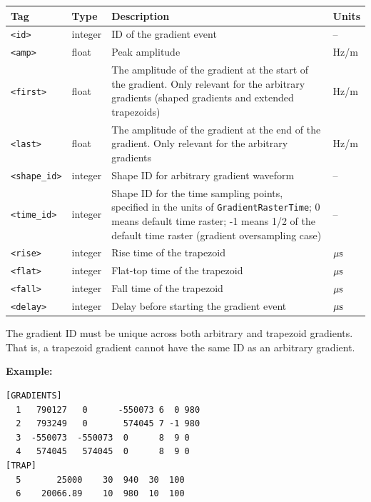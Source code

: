 \documentclass{article}
\begin{document}
\begin{tabularx}{\textwidth}{llXl}
\toprule
Tag & Type & Description & Units\\
\midrule
\verb.<id>. & integer & ID of the gradient event & -- \\
\verb.<amp>. & float & Peak amplitude & Hz/m \\
\verb.<first>. & float & The amplitude of the gradient at the start of the gradient. Only relevant for the arbitrary gradients (shaped gradients and extended trapezoids) & Hz/m \\
\verb.<last>. & float & The amplitude of the gradient at the end of the gradient. Only relevant for the arbitrary gradients & Hz/m \\
\verb.<shape_id>. & integer & Shape ID for arbitrary gradient waveform & -- \\
\verb.<time_id>. & integer & Shape ID for the time sampling points, specified in the units of \verb.GradientRasterTime.; 0 means default time raster; -1 means 1/2 of the default time raster (gradient oversampling case) & -- \\
\verb.<rise>. & integer & Rise time of the trapezoid & $\rm \mu s$ \\
\verb.<flat>. & integer & Flat-top time of the trapezoid & $\rm \mu s$ \\
\verb.<fall>. & integer & Fall time of the trapezoid & $\rm \mu s$ \\
\verb.<delay>. & integer & Delay before starting the gradient event & $\rm \mu s$\\
\bottomrule
\end{tabularx}

The gradient ID must be unique across both arbitrary and trapezoid gradients. That is, a trapezoid gradient cannot have the same ID as an arbitrary gradient.


\begin{minipage}{\textwidth}
\textbf{Example:}
\begin{lstlisting}
[GRADIENTS]
  1   790127   0      -550073 6  0 980
  2   793249   0       574045 7 -1 980
  3  -550073  -550073  0      8  9 0
  4   574045   574045  0      8  9 0
[TRAP]
  5       25000    30  940  30  100
  6    20066.89    10  980  10  100
\end{lstlisting}
\end{minipage}
\end{document}
